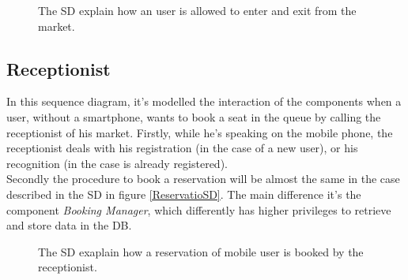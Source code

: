 \begin{figure}[H]
  \label{EntryExitSD}
  \centering
    \caption{The SD explain how an user is allowed to enter and exit from the market.}
\end{figure} 

\pagebreak

\subsection{Receptionist}
In this sequence diagram, it's modelled the interaction of the components when a user, without a smartphone, wants to book a seat in the queue by calling the receptionist of his market. Firstly, while he's speaking on the mobile phone, the receptionist deals with his registration (in the case of a new user), or his recognition (in the case is already registered).\\
Secondly the procedure to book a reservation will be almost the same in the case described in the SD in figure \ref{ReservatioSD}. The main difference it's the component \textit{Booking Manager}, which differently has higher privileges to retrieve and store data in the DB.

\begin{figure}[H]
  \label{MobileUserSD}
  \centering
    \caption{The SD exaplain how a reservation of mobile user is booked by the receptionist.}
\end{figure} 

